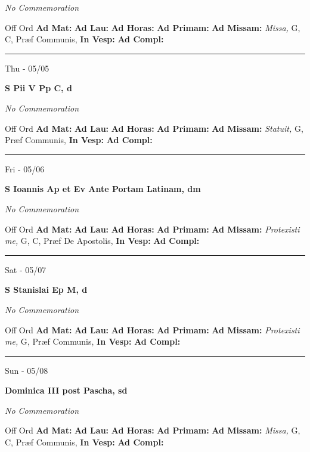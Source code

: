 \documentclass[letterpaper, 10pt]{article}
\begin{document}
\textit{No Commemoration}\begin{justify}
Off Ord
\textbf{Ad Mat: }
\textbf{Ad Lau: }
\textbf{Ad Horas: }
\textbf{Ad Primam: }
\textbf{Ad Missam:} \textit{Missa, } G, C, Præf Communis, 
\textbf{In Vesp: }
\textbf{Ad Compl: }\end{justify}



\hrule
\begin{center}
Thu - 05/05
\end{center}\textbf{ \large S Pii V Pp C, \textnormal{\normalsize d}}

\textit{No Commemoration}\begin{justify}
Off Ord
\textbf{Ad Mat: }
\textbf{Ad Lau: }
\textbf{Ad Horas: }
\textbf{Ad Primam: }
\textbf{Ad Missam:} \textit{Statuit, } G, Præf Communis, 
\textbf{In Vesp: }
\textbf{Ad Compl: }\end{justify}



\hrule
\begin{center}
Fri - 05/06
\end{center}\textbf{ \large S Ioannis Ap et Ev Ante Portam Latinam, \textnormal{\normalsize dm}}

\textit{No Commemoration}\begin{justify}
Off Ord
\textbf{Ad Mat: }
\textbf{Ad Lau: }
\textbf{Ad Horas: }
\textbf{Ad Primam: }
\textbf{Ad Missam:} \textit{Protexisti me, } G, C, Præf De Apostolis, 
\textbf{In Vesp: }
\textbf{Ad Compl: }\end{justify}



\hrule
\begin{center}
Sat - 05/07
\end{center}\textbf{ \large S Stanislai Ep M, \textnormal{\normalsize d}}

\textit{No Commemoration}\begin{justify}
Off Ord
\textbf{Ad Mat: }
\textbf{Ad Lau: }
\textbf{Ad Horas: }
\textbf{Ad Primam: }
\textbf{Ad Missam:} \textit{Protexisti me, } G, Præf Communis, 
\textbf{In Vesp: }
\textbf{Ad Compl: }\end{justify}



\hrule
\begin{center}
Sun - 05/08
\end{center}\textbf{ \large Dominica III post Pascha, \textnormal{\normalsize sd}}

\textit{No Commemoration}\begin{justify}
Off Ord
\textbf{Ad Mat: }
\textbf{Ad Lau: }
\textbf{Ad Horas: }
\textbf{Ad Primam: }
\textbf{Ad Missam:} \textit{Missa, } G, C, Præf Communis, 
\textbf{In Vesp: }
\textbf{Ad Compl: }\end{justify}
\end{document}
